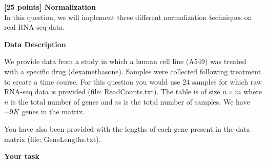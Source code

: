 {\bf [25 points] Normalization}\\

In this question, we will implement three different normalization techniques on real RNA-seq data.

\textbf{Data Description}


We provide data from a study in which a human cell line (A549) was treated with a specific drug (dexamethasone). Samples were collected following treatment to create a time course. For this question you would use 24 samples for which raw RNA-seq data is provided (file: ReadCounts.txt). The table is of size $n\times m$ where $n$ is the total number of genes and $m$ is the total number of samples. We have $\sim 9K$ genes in the matrix. 

You have also been provided with the lengths of each gene present in the data matrix (file: GeneLengths.txt).

\vspace{20pt}

\textbf{Your task}

